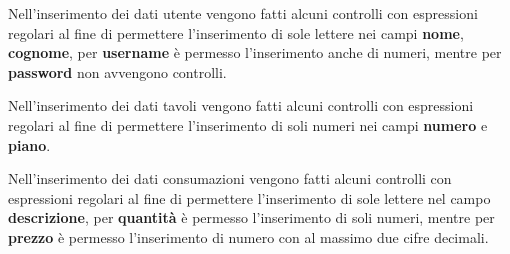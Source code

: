 Nell'inserimento dei dati utente vengono fatti alcuni controlli con espressioni regolari al fine di permettere l'inserimento di sole lettere nei campi \textbf{nome}, \textbf{cognome}, per \textbf{username} è permesso l'inserimento anche di numeri, mentre per \textbf{password}  non avvengono controlli.

Nell'inserimento dei dati tavoli vengono fatti alcuni controlli con espressioni regolari al fine di permettere l'inserimento di soli numeri nei campi \textbf{numero} e \textbf{piano}.

Nell'inserimento dei dati consumazioni vengono fatti alcuni controlli con espressioni regolari al fine di permettere l'inserimento di sole lettere nel campo \textbf{descrizione}, per \textbf{quantità} è permesso l'inserimento di soli numeri, mentre per \textbf{prezzo} è permesso l'inserimento di numero con al massimo due cifre decimali.

\clearpage
	